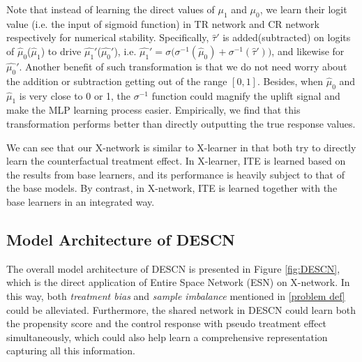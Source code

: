 \documentclass[sigconf]{acmart}
\begin{document}
Note that instead of learning the direct values of $\mu_1$ and $\mu_0$, we learn their logit value (i.e. the input of sigmoid function) in TR network and CR network respectively for numerical stability. Specifically, $\hat{\tau}'$ is added(subtracted) on logits of $\hat\mu_0$($\hat\mu_1$) to drive $\hat{\mu_{1}}'$($\hat{\mu_{0}}'$), i.e. $\hat{\mu_{1}}' = \sigma\big(\sigma^{-1}(\hat\mu_0) + \sigma^{-1}(\hat{\tau}')\big)$, and likewise for $\hat{\mu_{0}}'$. Another benefit of such transformation is that we do not need worry about the addition or subtraction getting out of the range $[0,1]$. Besides, when $\hat\mu_0$ and $\hat\mu_1$ is very close to 0 or 1, the $\sigma^{-1}$ function could magnify the uplift signal and make the MLP learning process easier. Empirically, we find that this transformation performs better than directly outputting the true response values.

We can see that our X-network is similar to X-learner in that both try to directly learn the counterfactual treatment effect. In X-learner, ITE is learned based on the results from base learners, and its performance is heavily subject to that of the base models. By contrast, in X-network, ITE is learned together with the base learners in an integrated way.  




\subsection{Model Architecture of DESCN}
The overall model architecture of DESCN is presented in Figure \ref{fig:DESCN}, which is the direct application of Entire Space Network (ESN) on X-network. In this way, both \textit{treatment bias} and \textit{sample imbalance} mentioned in \ref{problem def} could be alleviated. Furthermore, the shared network in DESCN could learn both the propensity score and the control response with pseudo treatment effect simultaneously, which could also help learn a comprehensive representation capturing all this information. 
\end{document}
